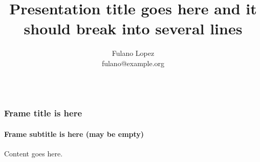 \documentclass{beamer}
\begin{document}
\title{Presentation title goes here and it should break into several lines}
\author[F.Lopez]{Fulano Lopez \\
fulano@example.org \\~
}


\begin{frame}
    \maketitle
\end{frame}


\begin{frame}[fragile]
    \frametitle{Frame title is here}
    \framesubtitle{Frame subtitle is here (may be empty)}
    Content goes here.
\end{frame}

\begin{frame}[final]
\end{frame}
\end{document}
